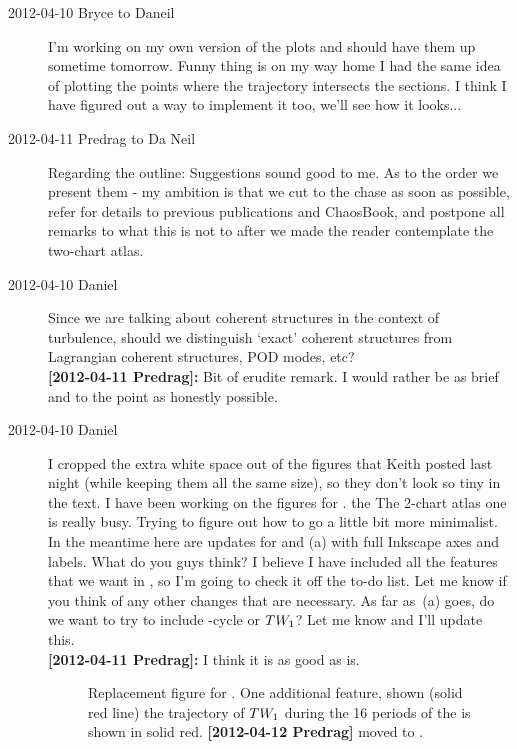 \begin{description}
\item[2012-04-10 Bryce to Daneil] I'm working on my own version of the
plots and should have them up sometime tomorrow. Funny thing is on my way
home I had the same idea of plotting the points where the trajectory
intersects the sections. I think I have figured out a way to implement it
too, we'll see how it looks...

\item[2012-04-11 Predrag to Da Neil] Regarding the outline: Suggestions
sound good to me. As to the order we present them - my ambition is that
we cut to the chase as soon as possible, refer for details to previous
publications and ChaosBook, and postpone all remarks to what this is not
to after we made the reader contemplate the two-chart atlas.

\item[2012-04-10 Daniel]
    Since we are talking about coherent structures in the context
    of turbulence, should we distinguish `exact' coherent structures from
    Lagrangian coherent structures, POD modes, etc?
 \\
{\bf [2012-04-11 Predrag]: } Bit of erudite remark. I would rather be as
brief and to the point as honestly possible.

\item[2012-04-10 Daniel] I cropped the extra white space out of the
figures that Keith posted last night (while keeping them all the same
size), so they don't look so tiny in the text. I have been working on the
figures for \cLf. the The 2-chart atlas one is really busy. Trying to
figure out how to go a little bit more minimalist. In the meantime here
are updates for  and (a)
with full Inkscape axes and labels. What do you guys think? I believe I
have included all the features that we want in , so
I'm going to check it off the to-do list. Let me know if you think of any
other changes that are necessary. As far as \,(a)
goes, do we want to try to include -cycle or $TW_{1}$? Let
me know and I'll update this. \\
{\bf [2012-04-11 Predrag]: } I think it is as good as is.


\begin{figure}
  \caption{\label{fig:CLEWurst}
  Replacement figure for . One additional feature,
  shown (solid red line) the trajectory of $TW_{1}$ during the 16
  periods of the \rpo is shown in solid red.
  {\bf [2012-04-12 Predrag]} moved to .
  }
\end{figure}


\end{description}
